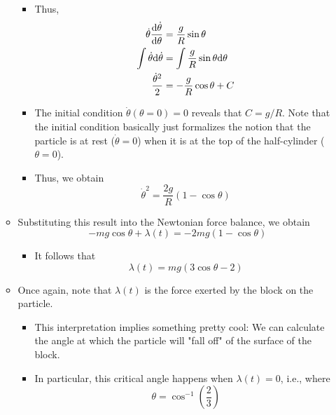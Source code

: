 \documentclass[../notes.tex]{subfiles}
\begin{document}
\begin{itemize}
\begin{itemize}
\begin{itemize}
\begin{equation*}
            \end{equation*}
            \item Thus,
            \begin{align*}
                \dot{\theta}\dv{\dot{\theta}}{\theta} &= \frac{g}{R}\sin\theta\\
                \int\dot{\theta}\dd\dot{\theta} &= \int\frac{g}{R}\sin\theta\dd\theta\\
                \frac{\dot{\theta}^2}{2} &= -\frac{g}{R}\cos\theta+C
            \end{align*}
            \item The initial condition $\dot{\theta}(\theta=0)=0$ reveals that $C=g/R$. Note that the initial condition basically just formalizes the notion that the particle is at rest ($\dot{\theta}=0$) when it is at the top of the half-cylinder ($\theta=0$).
            \item Thus, we obtain
            \begin{equation*}
                \dot{\theta}^2 = \frac{2g}{R}(1-\cos\theta)
            \end{equation*}
        \end{itemize}
        \item Substituting this result into the Newtonian force balance, we obtain
        \begin{equation*}
            -mg\cos\theta+\lambda(t) = -2mg(1-\cos\theta)
        \end{equation*}
        \begin{itemize}
            \item It follows that
            \begin{equation*}
                \lambda(t) = mg(3\cos\theta-2)
            \end{equation*}
        \end{itemize}
        \item Once again, note that $\lambda(t)$ is the force exerted by the block on the particle.
        \begin{itemize}
            \item This interpretation implies something pretty cool: We can calculate the angle at which the particle will "fall off" of the surface of the block.
            \item In particular, this critical angle happens when $\lambda(t)=0$, i.e., where
            \begin{equation*}
                \theta = \cos^{-1}\left( \frac{2}{3} \right)
            \end{equation*}
        \end{itemize}
    \end{itemize}
\end{itemize}
\end{document}
